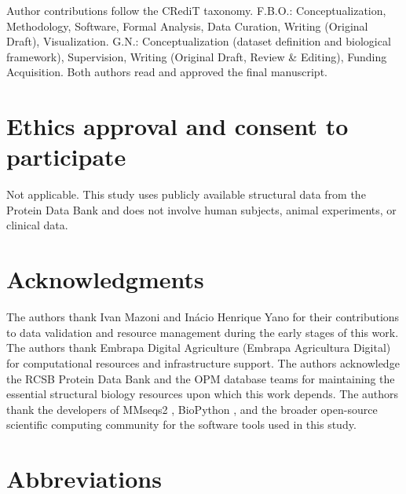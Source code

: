 \documentclass[unnumsec,webpdf,contemporary,large]{oup-authoring-template}
\begin{document}
Author contributions follow the CRediT taxonomy. F.B.O.: Conceptualization, Methodology, Software, Formal Analysis, Data Curation, Writing (Original Draft), Visualization. G.N.: Conceptualization (dataset definition and biological framework), Supervision, Writing (Original Draft, Review \& Editing), Funding Acquisition. Both authors read and approved the final manuscript.


\section{Ethics approval and consent to participate}

Not applicable. This study uses publicly available structural data from the Protein Data Bank and does not involve human subjects, animal experiments, or clinical data.



\section{Acknowledgments}

The authors thank Ivan Mazoni and In\'{a}cio Henrique Yano for their contributions to data validation and resource management during the early stages of this work. The authors thank Embrapa Digital Agriculture (Embrapa Agricultura Digital) for computational resources and infrastructure support. The authors acknowledge the RCSB Protein Data Bank \cite{berman2000, burley2023} and the OPM database \cite{lomize2012} teams for maintaining the essential structural biology resources upon which this work depends. The authors thank the developers of MMseqs2 \cite{steinegger2017}, BioPython \cite{cock2009}, and the broader open-source scientific computing community for the software tools used in this study.



\section{Abbreviations}
\end{document}
